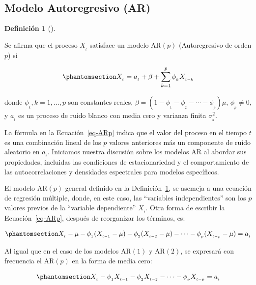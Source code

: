 \documentclass[
  us-letterpaper,
]{scrreprt}
\theoremstyle{definition}
\theoremstyle{plain}
\theoremstyle{plain}
\theoremstyle{definition}
\newtheorem{definition}{Definición}[chapter]
\theoremstyle{remark}
\begin{document}
\subsection{Modelo Autoregresivo (AR)}\label{modelo-autoregresivo-ar}

\begin{definition}[]\protect\hypertarget{def-mARp}{}\label{def-mARp}

Se afirma que el proceso \(X_{_t}\) satisface un modelo
\(\mathrm{AR}(p)\) (Autoregresivo de orden \(p\)) si

\begin{equation}\phantomsection\label{eq-ARp}{
X_{_t}=a_{_t}+\beta+\sum_{k=1}^p \phi_{_k}X_{_{t-k}}
}\end{equation}

donde \(\phi_{_k}, k=1,\ldots,p\) son constantes reales,
\(\beta = \left(1-\phi_{_1}-\phi_{_2}-\cdots-\phi_{_p}\right)\mu\),
\(\phi_{_p}\neq 0\), y \(a_{_t}\) es un proceso de ruido blanco con
media cero y varianza finita \(\sigma_{_a}^2\).

\end{definition}

La fórmula en la Ecuación~\ref{eq-ARp} indica que el valor del proceso
en el tiempo \(t\) es una combinación lineal de los \(p\) valores
anteriores más un componente de ruido aleatorio en \(a_{_t}\). Iniciamos
nuestra discusión sobre los modelos \(\mathrm{AR}\) al abordar sus
propiedades, incluidas las condiciones de estacionariedad y el
comportamiento de las autocorrelaciones y densidades espectrales para
modelos específicos.

El modelo \(\mathrm{AR}(p)\) general definido en la
Definición~\ref{def-mARp}, se asemeja a una ecuación de regresión
múltiple, donde, en este caso, las ``variables independientes'' son los
\(p\) valores previos de la ``variable dependiente'' \(X_{_t}\). Otra
forma de escribir la Ecuación~\ref{eq-ARp}, después de reorganizar los
términos, es:

\begin{equation}\phantomsection\label{eq-oarp}{
X_{_t}-\mu-\phi_{_1}(X_{_{t-1}}-\mu)-\phi_{_2}(X_{_{t-2}}-\mu)-\cdots-\phi_{_p}(X_{_{t-p}}-\mu)=a_{_t}
}\end{equation}

Al igual que en el caso de los modelos \(\mathrm{AR}(1)\) y
\(\mathrm{AR}(2)\), se expresará con frecuencia el \(\mathrm{AR}(p)\) en
la forma de media cero:

\begin{equation}\phantomsection\label{eq-m0arp}{
X_{_t} -\phi_{_1}X_{_{t-1}}-\phi_{_2}X_{_{t-2}}-\cdots-\phi_{_p}X_{_{t-p}}=a_{_t}
}\end{equation}
\end{document}
